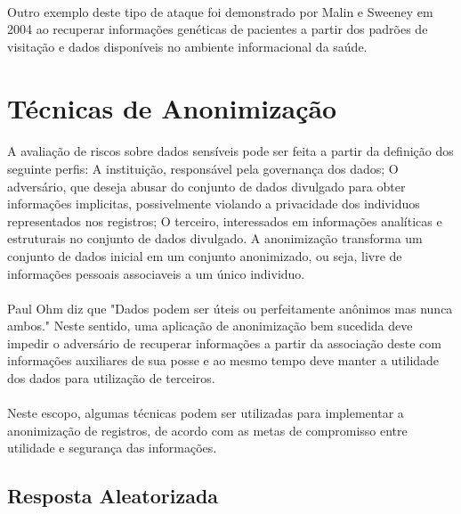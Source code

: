 \paragraph{} Outro exemplo deste tipo de ataque foi demonstrado por Malin e Sweeney\cite{malin2004} em 2004 ao recuperar informações genéticas de pacientes a partir dos padrões de visitação e dados disponíveis no ambiente informacional da saúde.

\section{Técnicas de Anonimização}

\paragraph{} A avaliação de riscos sobre dados sensíveis pode ser feita a partir da definição dos seguinte perfis: A instituição, responsável pela governança dos dados; O adversário, que deseja abusar do conjunto de dados divulgado para obter informações implicitas, possivelmente violando a privacidade dos individuos representados nos registros; O terceiro, interessados em informações analíticas e estruturais no conjunto de dados divulgado. A anonimização transforma um conjunto de dados inicial em um conjunto anonimizado, ou seja, livre de informações pessoais associaveis a um único individuo.

\paragraph{} Paul Ohm\cite{ohm2009} diz que "Dados podem ser úteis ou perfeitamente anônimos mas nunca ambos." Neste sentido, uma aplicação de anonimização bem sucedida deve impedir o adversário de recuperar informações a partir da associação deste com informações auxiliares de sua posse e ao mesmo tempo deve manter a utilidade dos dados para utilização de terceiros. 

\paragraph{} Neste escopo, algumas técnicas podem ser utilizadas para implementar a anonimização de registros, de acordo com as metas de compromisso entre utilidade e segurança das informações.

\subsection{Resposta Aleatorizada}


